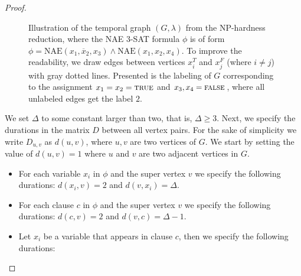 \documentclass[a4paper,UKenglish,cleveref, autoref, thm-restate]{lipics-v2021}
\begin{document}
\begin{proof}
%
\begin{figure}[t]
	\noindent
\caption{Illustration of the temporal graph $(G,\lambda)$ from the NP-hardness reduction, 
	where the NAE 3-SAT formula $\phi$ is of form $\phi = \text{NAE}(x_1, \overline{x}_2, x_3) \wedge \text{NAE}(x_1, x_2, x_4)$.
To improve the readability, we draw edges between vertices $x_i^T$ and $x_j^F$ (where $i \neq j$) with gray dotted lines.
Presented is the labeling of $G$ corresponding to the assignment $x_1=x_2=\textsc{true}$ and $x_3,x_4=\textsc{false}$,
where all unlabeled edges get the label $2$.
}\label{fig:NP-example}
\end{figure}
%
We set $\Delta$ to some constant larger than two, that is, $\Delta\ge 3$. Next, we specify the durations in the matrix $D$ between all vertex pairs.
For the sake of simplicity we write $D_{u,v}$ as $d(u,v)$,
where $u,v$ are two vertices of $G$. 
We start by setting the value of $d(u,v) = 1$ where $u$ and $v$ are two adjacent vertices in $G$.
\begin{itemize}
    \item For each variable $x_i$ in $\phi$ and the super vertex $v$
    we specify the following durations:
    $d(x_i,v)=2$ and $d(v,x_i)= \Delta $. %
    \item For each clause $c$ in $\phi$ and the super vertex $v$
    we specify the following durations:
    $d(c,v)=2$ and $d(v,c)= \Delta - 1$.
    \item Let $x_i$ be a variable that appears in clause $c$, then  we specify the following durations:

\end{itemize}
\end{proof}
\end{document}
